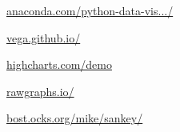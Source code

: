 \begin{description}[font=\normalfont,itemsep=0pt]
    \item[Python blog]
        \href{https://www.anaconda.com/python-data-visualization-2018-why-so-many-libraries/}{anaconda.com/python-data-vis.../}

    \item[Vega/-lite]
        \href{https://vega.github.io/}{vega.github.io/}

    \item[Highcharts]
        \href{https://www.highcharts.com/demo}{highcharts.com/demo}

    \item[Raw Graphics]
        \href{https://rawgraphs.io/}{rawgraphs.io/}

    \item[Sankey Demo]
        \href{https://bost.ocks.org/mike/sankey/}{bost.ocks.org/mike/sankey/}

\end{description}

